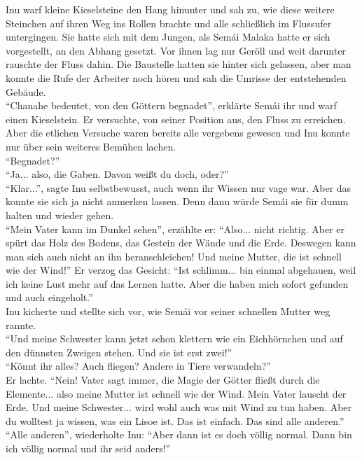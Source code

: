 \documentclass[a4paper,12pt]{book}
\begin{document}
Inu warf kleine Kieselsteine den Hang hinunter und sah zu, wie diese weitere Steinchen auf ihren 
Weg ins Rollen brachte und alle schließlich im Flussufer untergingen. Sie hatte sich mit dem 
Jungen, als Semái Malaka hatte er sich vorgestellt, an den Abhang gesetzt. Vor ihnen lag nur Geröll 
und weit darunter rauschte der Fluss dahin. Die Baustelle hatten sie hinter sich gelassen, aber man 
konnte die Rufe der Arbeiter noch hören und sah die Umrisse der entstehenden Gebäude. \\
``Chanahe bedeutet, von den Göttern begnadet'', erklärte Semái ihr und warf einen Kieselstein. Er 
versuchte, von seiner Position aus, den Fluss zu erreichen. Aber die etlichen Versuche waren 
bereits alle vergebens gewesen und Inu konnte nur über sein weiteres Bemühen lachen. \\
``Begnadet?''\\
``Ja... also, die Gaben. Davon weißt du doch, oder?''\\
``Klar...'', sagte Inu selbstbewusst, auch wenn ihr Wissen nur vage war. Aber das konnte sie sich 
ja nicht anmerken lassen. Denn dann würde Semái sie für dumm halten und wieder gehen. \\
``Mein Vater kann im Dunkel sehen'', erzählte er: ``Also... nicht richtig. Aber er spürt das Holz 
des Bodens, das Gestein der Wände und die Erde. Deswegen kann man sich auch nicht an ihn 
heranschleichen! Und meine Mutter, die ist schnell wie der Wind!'' Er verzog das Gesicht: ``Ist 
schlimm... bin einmal abgehauen, weil ich keine Lust mehr auf das Lernen hatte. Aber die haben mich 
sofort gefunden und auch eingeholt.''\\
Inu kicherte und stellte sich vor, wie Semái vor seiner schnellen Mutter weg rannte. \\
``Und meine Schwester kann jetzt schon klettern wie ein Eichhörnchen und auf den dünnsten Zweigen 
stehen. Und sie ist erst zwei!''\\
``Könnt ihr alles? Auch fliegen? Andere in Tiere verwandeln?''\\
Er lachte. ``Nein! Vater sagt immer, die Magie der Götter fließt durch die Elemente... also meine 
Mutter ist schnell wie der Wind. Mein Vater lauscht der Erde. Und meine Schwester... wird wohl auch 
was mit Wind zu tun haben. Aber du wolltest ja wissen, was ein Lisoe ist. Das ist einfach. Das sind 
alle anderen.''\\
``Alle anderen'', wiederholte Inu: ``Aber dann ist es doch völlig normal. Dann bin ich völlig 
normal und ihr seid anders!''\\
\end{document}
